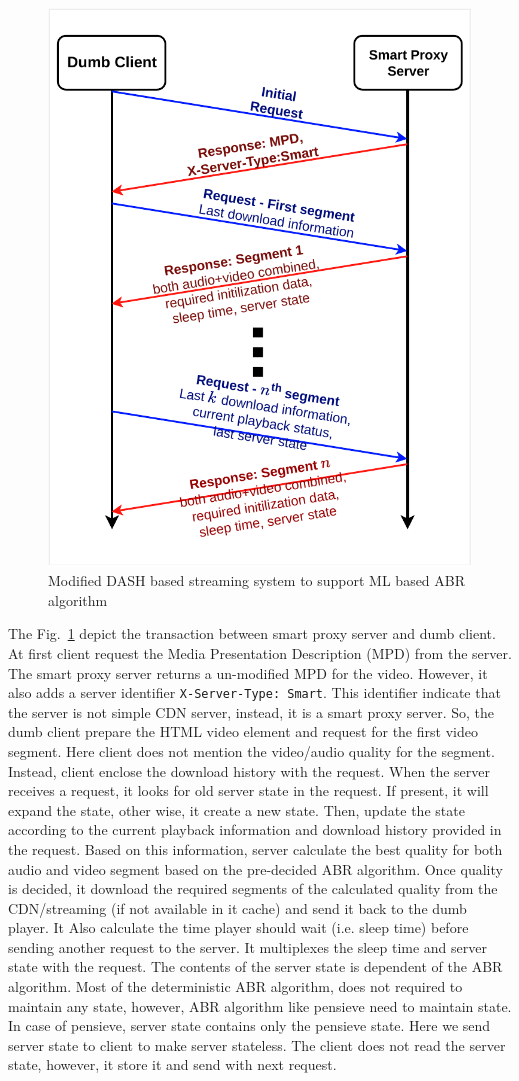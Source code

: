 \begin{figure}[h]
	\begin{center}
		\includegraphics[width=0.5\linewidth]{img/splitDASHTransaction}
	\end{center}
	\caption{\label{fig:splitDASHTransaction} Modified DASH based streaming system to support ML based ABR algorithm}
\end{figure}

The Fig.~\ref{fig:splitDASHTransaction} depict the transaction between smart proxy server and dumb client. At first client request the Media Presentation Description (MPD) from the server. The smart proxy server returns a un-modified MPD for the video. However, it also adds a server identifier {\tt X-Server-Type: Smart}. This identifier indicate that the server is not simple CDN server, instead, it is a smart proxy server. So, the dumb client prepare the HTML video element and request for the first video segment. Here client does not mention the video/audio quality for the segment. Instead, client enclose the download history with the request. When the server receives a request, it looks for old server state in the request. If present, it will expand the state, other wise, it create a new state. Then, update the state according to the current playback information and download history provided in the request. Based on this information, server calculate the best quality for both audio and video segment based on the pre-decided ABR algorithm. Once quality is decided, it download the required segments of the calculated quality from the CDN/streaming (if not available in it cache) and send it back to the dumb player. It Also calculate the time player should wait (i.e. sleep time) before sending another request to the server. It multiplexes the sleep time and server state with the request. The contents of the server state is dependent of the ABR algorithm. Most of the deterministic ABR algorithm, does not required to maintain any state, however, ABR algorithm like pensieve need to maintain state. In case of pensieve, server state contains only the pensieve state.
Here we send server state to client to make server stateless. The client does not read the server state, however, it store it and send with next request.

